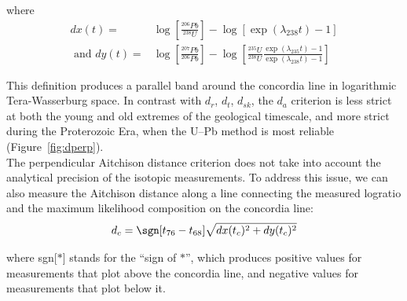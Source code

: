 \documentclass[gchron, manuscript]{copernicus}
\begin{document}
\noindent where
\begin{equation}
\begin{split}
  dx(t)  = & \log\!\left[\frac{{}^{206}Pb}{{}^{238}U}\right]-
  \log\!\left[\exp(\lambda_{238} t)-1\right] \\
  \mbox{~and~}
  dy(t) = & \log\!\left[\frac{{}^{207}Pb}{{}^{206}Pb}\right] -
      \log\!\left[\frac{{}^{235}U}{{}^{238}U}
        \frac{\exp(\lambda_{235}t)-1}{\exp(\lambda_{238}t)-1}
        \right]
  \end{split}
\end{equation}

This definition produces a parallel band around the concordia line in
logarithmic Tera-Wasserburg space. In contrast with $d_r$, $d_t$,
$d_{sk}$, the $d_a$ criterion is less strict at both the young and old
extremes of the geological timescale, and more strict during the
Proterozoic Era, when the U--Pb method is most reliable
(Figure~\ref{fig:dperp}).\\

The perpendicular Aitchison distance criterion does not take into
account the analytical precision of the isotopic measurements.  To
address this issue, we can also measure the Aitchison distance along a
line connecting the measured logratio and the maximum likelihood
composition on the concordia line:
\begin{equation}
  d_c = \sgn[t_{76}-t_{68}] \sqrt{ dx(t_c)^2 + dy(t_c)^2 }
  \label{eq:da}
\end{equation}

\noindent where sgn[$\ast$] stands for the ``sign of $\ast$'', which
produces positive values for measurements that plot above the
concordia line, and negative values for measurements that plot below
it.
\end{document}

